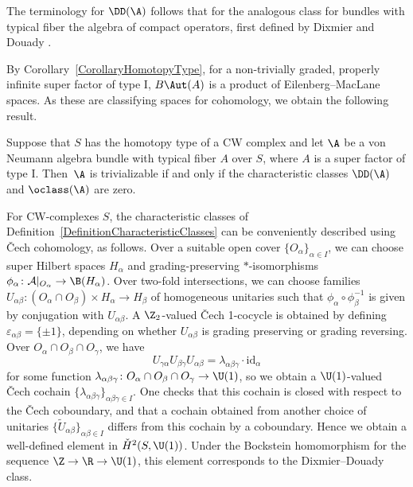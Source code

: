 The terminology for $\DD(\A)$ follows that for the analogous class for bundles with typical fiber the algebra of compact operators, first defined by Dixmier and Douady \cite{DixmierDouady}.

By Corollary~\ref{CorollaryHomotopyType}, for a non-trivially graded, properly infinite super factor of type I, $B\Aut(A)$ is a product of Eilenberg--MacLane spaces.
As these are classifying spaces for cohomology, we obtain the following result.

\begin{Proposition}
Suppose that $S$ has the homotopy type of a CW complex and let $\A$ be a von Neumann algebra bundle with typical fiber $A$ over $S$, where $A$ is a super factor of type I.
Then~$\A$ is trivializable if and only if the characteristic classes $\DD(\A)$ and $\oclass(\A)$ are zero.
\end{Proposition}

\begin{Remark} \label{RemarkCheckPicture}
For CW-complexes $S$, the characteristic classes of Definition~\ref{DefinitionCharacteristicClasses} can be conveniently described using \v{C}ech cohomology, as follows.
Over a suitable open cover $\{O_\alpha\}_{\alpha \in I}$, we can choose super Hilbert spaces $H_\alpha$ and grading-preserving $*$-isomorphisms $\phi_\alpha\colon \mathcal{A}|_{O_\alpha} \to \B(H_\alpha)$.
Over two-fold intersections, we can choose families $U_{\alpha\beta}\colon (O_\alpha \cap O_\beta) \times H_\alpha \to H_\beta$ of homogeneous unitaries such that $\phi_\alpha \circ \phi_\beta^{-1}$ is given by conjugation with $U_{\alpha\beta}$.
A $\Z_2$-valued \v{C}ech 1-cocycle is obtained by defining $\varepsilon_{\alpha\beta} = \{\pm 1\}$, depending on whether $U_{\alpha\beta}$ is grading preserving or grading reversing.
Over $O_\alpha \cap O_\beta \cap O_\gamma$, we have
\begin{equation*}
U_{\gamma \alpha} U_{\beta\gamma} U_{\alpha\beta} = \lambda_{\alpha\beta\gamma} \cdot \mathrm{id}_\alpha
\end{equation*}
for some function $\lambda_{\alpha\beta\gamma} \colon O_\alpha \cap O_\beta \cap O_\gamma \to \U(1)$, so we obtain a $\U(1)$-valued \v{C}ech cochain $\{\lambda_{\alpha\beta\gamma}\}_{\alpha\beta\gamma\in I}$.
One checks that this cochain is closed with respect to the \v{C}ech coboundary, and that a cochain obtained from another choice of unitaries $\{\tilde{U}_{\alpha\beta}\}_{\alpha \beta \in I}$ differs from this cochain by a coboundary.
Hence we obtain a well-defined element in $\check{H}^2(S, \U(1))$.
Under the Bockstein homomorphism for the sequence $\Z \to \R \to \U(1)$, this element corresponds to the Dixmier--Douady class.
\end{Remark}

